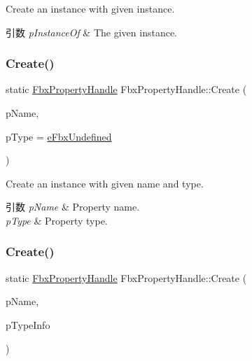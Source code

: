 Create an instance with given instance. 
\begin{DoxyParams}{引数}
{\em p\+Instance\+Of} & The given instance. \\
\hline
\end{DoxyParams}
\mbox{\label{class_fbx_property_handle_abaec4c3b07728510a42c9205fcdb2f53}} 
\subsubsection{\texorpdfstring{Create()}{Create()}\hspace{0.1cm}{\footnotesize\ttfamily [3/4]}}
{\footnotesize\ttfamily static \hyperlink{class_fbx_property_handle}{Fbx\+Property\+Handle} Fbx\+Property\+Handle\+::\+Create (\begin{DoxyParamCaption}\item[{const char $\ast$}]{p\+Name,  }\item[{\hyperlink{fbxpropertytypes_8h_a73913a5ddfb20e57c6f25e9e6784bd92}{E\+Fbx\+Type}}]{p\+Type = {\ttfamily \hyperlink{fbxpropertytypes_8h_a73913a5ddfb20e57c6f25e9e6784bd92a150b400dddd0f8b5c7e22a1bba0721d8}{e\+Fbx\+Undefined}} }\end{DoxyParamCaption})\hspace{0.3cm}{\ttfamily [static]}}

Create an instance with given name and type. 
\begin{DoxyParams}{引数}
{\em p\+Name} & Property name. \\
\hline
{\em p\+Type} & Property type. \\
\hline
\end{DoxyParams}
\mbox{\label{class_fbx_property_handle_a4f3c6191091b367a05d58984a49e8229}} 
\subsubsection{\texorpdfstring{Create()}{Create()}\hspace{0.1cm}{\footnotesize\ttfamily [4/4]}}
{\footnotesize\ttfamily static \hyperlink{class_fbx_property_handle}{Fbx\+Property\+Handle} Fbx\+Property\+Handle\+::\+Create (\begin{DoxyParamCaption}\item[{const char $\ast$}]{p\+Name,  }\item[{\hyperlink{class_fbx_property_handle}{Fbx\+Property\+Handle}}]{p\+Type\+Info }\end{DoxyParamCaption})\hspace{0.3cm}{\ttfamily [static]}}

